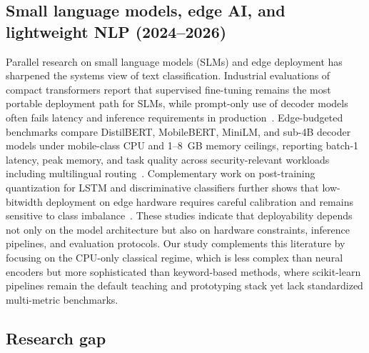 \documentclass[pdflatex,sn-mathphys-num]{sn-jnl}
\begin{document}
\subsection{Small language models, edge AI, and lightweight NLP (2024--2026)}

Parallel research on small language models (SLMs) and edge deployment has sharpened the systems view of text classification. Industrial evaluations of compact transformers report that supervised fine-tuning remains the most portable deployment path for SLMs, while prompt-only use of decoder models often fails latency and inference requirements in production~\cite{schneider2025slm}. Edge-budgeted benchmarks compare DistilBERT, MobileBERT, MiniLM, and sub-4B decoder models under mobile-class CPU and 1--8~GB memory ceilings, reporting batch-1 latency, peak memory, and task quality across security-relevant workloads including multilingual routing~\cite{pissinou2025edge}. Complementary work on post-training quantization for LSTM and discriminative classifiers further shows that low-bitwidth deployment on edge hardware requires careful calibration and remains sensitive to class imbalance~\cite{rahaman2025ptq}. These studies indicate that deployability depends not only on the model architecture but also on hardware constraints, inference pipelines, and evaluation protocols. Our study complements this literature by focusing on the CPU-only classical regime, which is less complex than neural encoders but more sophisticated than keyword-based methods, where scikit-learn pipelines remain the default teaching and prototyping stack yet lack standardized multi-metric benchmarks.

\subsection{Research gap}
\end{document}
